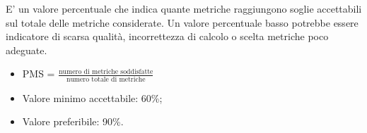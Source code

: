 		E' un valore percentuale che indica quante metriche raggiungono soglie accettabili sul totale delle metriche considerate. Un valore percentuale basso potrebbe essere indicatore di scarsa qualità, incorrettezza di calcolo o scelta metriche poco adeguate.
		\begin{itemize}
			\item{PMS = $\displaystyle\frac{\mbox{numero di metriche soddisfatte}}{\mbox{numero totale di metriche}}$}
			\item{Valore minimo accettabile: 60\%;}
			\item{Valore preferibile: 90\%.}
		\end{itemize}
